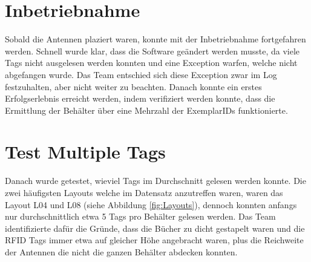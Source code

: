 \documentclass[parskip=full, a4paper]{scrartcl}
\begin{document}
\section{Inbetriebnahme}
Sobald die Antennen plaziert waren, konnte mit der Inbetriebnahme fortgefahren werden. Schnell wurde klar, dass die Software geändert werden musste, da viele Tags nicht ausgelesen werden konnten und eine Exception warfen, welche nicht abgefangen wurde. Das Team entschied sich diese Exception zwar im Log festzuhalten, aber nicht weiter zu beachten. Danach konnte ein erstes Erfolgserlebnis erreicht werden, indem verifiziert werden konnte, dass die Ermittlung der Behälter über eine Mehrzahl der ExemplarIDs funktionierte.

\section{Test Multiple Tags}
Danach wurde getestet, wieviel Tags im Durchschnitt gelesen werden konnte. Die zwei häufigsten Layouts welche im Datensatz anzutreffen waren, waren das Layout L04 und L08 (siehe Abbildung \ref{fig:Layouts}), dennoch konnten anfangs nur durchschnittlich etwa 5 Tags pro Behälter gelesen werden. Das Team identifizierte dafür die Gründe, dass die Bücher zu dicht gestapelt waren und die RFID Tags immer etwa auf gleicher Höhe angebracht waren, plus die Reichweite der Antennen die nicht die ganzen Behälter abdecken konnten.
\end{document}
